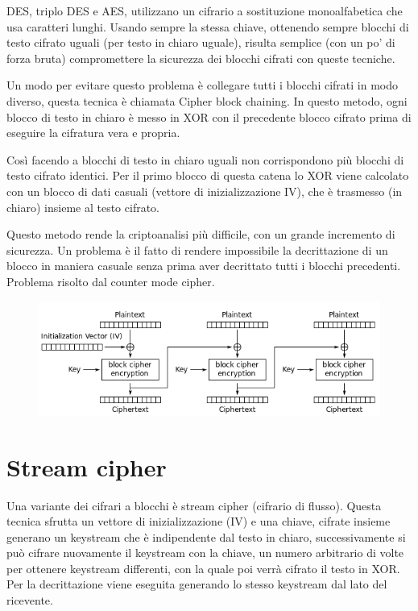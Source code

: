 DES, triplo DES e AES, utilizzano un cifrario a sostituzione monoalfabetica che usa caratteri lunghi. Usando sempre la stessa chiave, ottenendo sempre blocchi di testo cifrato uguali (per testo in chiaro uguale), risulta semplice (con un po’ di forza bruta) compromettere la sicurezza dei blocchi cifrati con queste tecniche.

Un modo per evitare questo problema è collegare tutti i blocchi cifrati in modo diverso, questa tecnica è chiamata Cipher block chaining.
In questo metodo, ogni blocco di testo in chiaro è messo in XOR con il precedente blocco cifrato prima di eseguire la cifratura vera e propria.

Così facendo a blocchi di testo in chiaro uguali non corrispondono più blocchi di testo cifrato identici. Per il primo blocco di questa catena lo XOR viene calcolato con un blocco di dati casuali (vettore di inizializzazione IV), che è trasmesso (in chiaro) insieme al testo cifrato.

Questo metodo rende la criptoanalisi più difficile, con un grande incremento di sicurezza. Un problema è il fatto di rendere impossibile la decrittazione di un blocco in maniera casuale senza prima aver decrittato tutti i blocchi precedenti. Problema risolto dal counter mode cipher.
 
\begin{figure}[H]
\centering
\includegraphics[scale=0.7]{res/img/55_CBC.png}
\end{figure}

\section{Stream cipher}

Una variante dei cifrari a blocchi è stream cipher (cifrario di flusso).
Questa tecnica sfrutta un vettore di inizializzazione (IV) e una chiave, cifrate insieme generano un keystream che è indipendente dal testo in chiaro, successivamente si può cifrare nuovamente il keystream con la chiave, un numero arbitrario di volte per ottenere keystream differenti, con la quale poi verrà cifrato il testo in XOR.
Per la decrittazione viene eseguita generando lo stesso keystream dal lato del ricevente.

